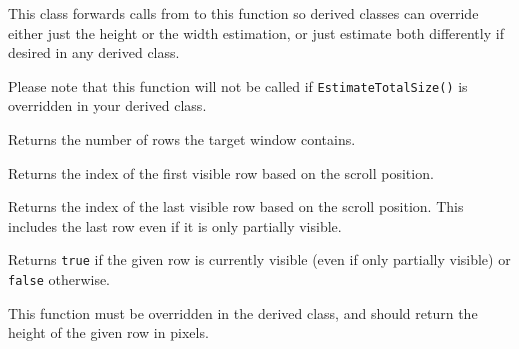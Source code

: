 This class forwards calls from
to this function so derived classes can override either just the height or
the width estimation, or just estimate both differently if desired in any
 derived class.

Please note that this function will not be called if {\tt EstimateTotalSize()}
is overridden in your derived class.


\label{wxvarvscrollhelpergetrowcount}


Returns the number of rows the target window contains.




\label{wxvarvscrollhelpergetvisiblerowsbegin}


Returns the index of the first visible row based on the scroll position.


\label{wxvarvscrollhelpergetvisiblerowsend}


Returns the index of the last visible row based on the scroll position. This
includes the last row even if it is only partially visible.


\label{wxvarvscrollhelperisrowvisible}


Returns {\tt true} if the given row is currently visible (even if only
partially visible) or {\tt false} otherwise.


\label{wxvarvscrollhelperongetrowheight}


This function must be overridden in the derived class, and should return the
height of the given row in pixels.


\label{wxvarvscrollhelperongetrowsheighthint}

